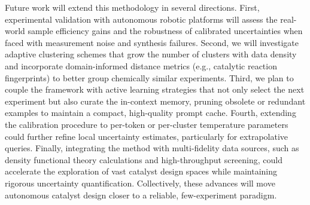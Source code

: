 \documentclass{article}
\begin{document}
Future work will extend this methodology in several directions. First, experimental validation with autonomous robotic platforms will assess the real-world sample efficiency gains and the robustness of calibrated uncertainties when faced with measurement noise and synthesis failures. Second, we will investigate adaptive clustering schemes that grow the number of clusters with data density and incorporate domain-informed distance metrics (e.g., catalytic reaction fingerprints) to better group chemically similar experiments. Third, we plan to couple the framework with active learning strategies that not only select the next experiment but also curate the in-context memory, pruning obsolete or redundant examples to maintain a compact, high-quality prompt cache. Fourth, extending the calibration procedure to per-token or per-cluster temperature parameters could further refine local uncertainty estimates, particularly for extrapolative queries. Finally, integrating the method with multi-fidelity data sources, such as density functional theory calculations and high-throughput screening, could accelerate the exploration of vast catalyst design spaces while maintaining rigorous uncertainty quantification. Collectively, these advances will move autonomous catalyst design closer to a reliable, few-experiment paradigm.



\end{document}
